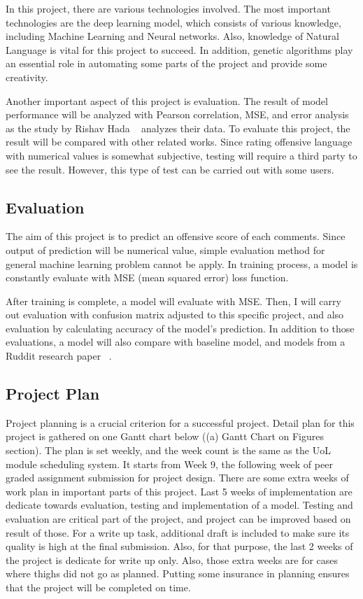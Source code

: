 \documentclass[11pt, natbib=false]{article}
\begin{document}
In this project, there are various technologies involved.
The most important technologies are the deep learning model, which consists of various knowledge, including Machine Learning and Neural networks.
Also, knowledge of Natural Language is vital for this project to succeed.
In addition, genetic algorithms play an essential role in automating some parts of the project and provide some creativity.

Another important aspect of this project is evaluation.
The result of model performance will be analyzed with Pearson correlation, MSE, and error analysis as the study by Rishav Hada ~\cite{hada2021ruddit} analyzes their data.
To evaluate this project, the result will be compared with other related works.
Since rating offensive language with numerical values is somewhat subjective, testing will require a third party to see the result.
However, this type of test can be carried out with some users. 

\subsection{Evaluation}
The aim of this project is to predict an offensive score of each comments.
Since output of prediction will be numerical value, simple evaluation method for general machine learning problem cannot be apply.
In training process, a model is constantly evaluate with MSE (mean squared error) loss function.

After training is complete, a model will evaluate with MSE.
Then, I will carry out evaluation with confusion matrix adjusted to this specific project, and also evaluation by calculating accuracy of the model’s prediction.
In addition to those evaluations, a model will also compare with baseline model, and models from a Ruddit research paper ~\cite{hada2021ruddit}.


\subsection{Project Plan}
Project planning is a crucial criterion for a successful project.
Detail plan for this project is gathered on one Gantt chart below ((a) Gantt Chart on Figures section).
The plan is set weekly, and the week count is the same as the UoL module scheduling system.
It starts from Week 9, the following week of peer graded assignment submission for project design.
There are some extra weeks of work plan in important parts of this project.
Last 5 weeks of implementation are dedicate towards evaluation, testing and implementation of a model.
Testing and evaluation are critical part of the project, and project can be improved based on result of those.
For a write up task, additional draft is included to make sure its quality is high at the final submission.
Also, for that purpose, the last 2 weeks of the project is dedicate for write up only.
Also, those extra weeks are for cases where thighs did not go as planned.
Putting some insurance in planning ensures that the project will be completed on time. 
\end{document}
